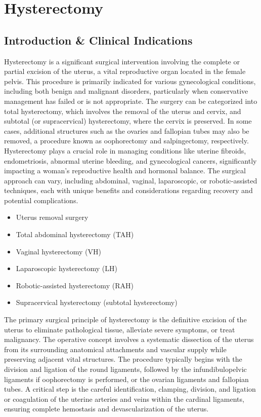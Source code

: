\chapter{Hysterectomy}

\section*{Introduction \& Clinical Indications}
Hysterectomy is a significant surgical intervention involving the complete or partial excision of the uterus, a vital reproductive organ located in the female pelvis. This procedure is primarily indicated for various gynecological conditions, including both benign and malignant disorders, particularly when conservative management has failed or is not appropriate. The surgery can be categorized into total hysterectomy, which involves the removal of the uterus and cervix, and subtotal (or supracervical) hysterectomy, where the cervix is preserved. In some cases, additional structures such as the ovaries and fallopian tubes may also be removed, a procedure known as oophorectomy and salpingectomy, respectively. Hysterectomy plays a crucial role in managing conditions like uterine fibroids, endometriosis, abnormal uterine bleeding, and gynecological cancers, significantly impacting a woman's reproductive health and hormonal balance. The surgical approach can vary, including abdominal, vaginal, laparoscopic, or robotic-assisted techniques, each with unique benefits and considerations regarding recovery and potential complications.

\begin{itemize}
  \item Uterus removal surgery
  \item Total abdominal hysterectomy (TAH)
  \item Vaginal hysterectomy (VH)
  \item Laparoscopic hysterectomy (LH)
  \item Robotic-assisted hysterectomy (RAH)
  \item Supracervical hysterectomy (subtotal hysterectomy)
\end{itemize}

The primary surgical principle of hysterectomy is the definitive excision of the uterus to eliminate pathological tissue, alleviate severe symptoms, or treat malignancy. The operative concept involves a systematic dissection of the uterus from its surrounding anatomical attachments and vascular supply while preserving adjacent vital structures. The procedure typically begins with the division and ligation of the round ligaments, followed by the infundibulopelvic ligaments if oophorectomy is performed, or the ovarian ligaments and fallopian tubes. A critical step is the careful identification, clamping, division, and ligation or coagulation of the uterine arteries and veins within the cardinal ligaments, ensuring complete hemostasis and devascularization of the uterus.


